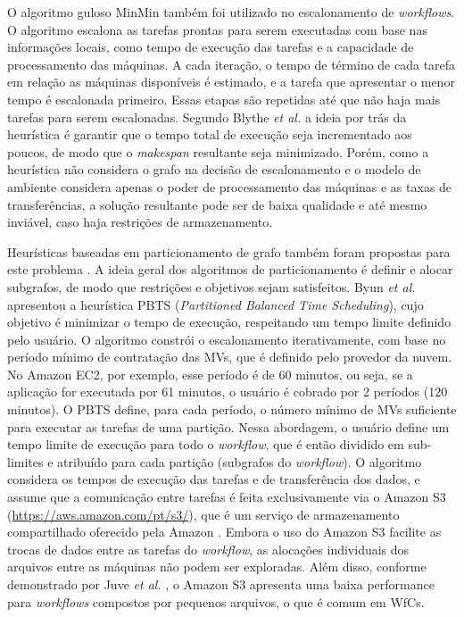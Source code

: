 O algoritmo guloso MinMin \cite{minmin} também foi utilizado no escalonamento de \textit{workflows}. O algoritmo escalona as tarefas prontas para serem executadas com base nas informações locais, como tempo de execução das tarefas e a capacidade de processamento das máquinas. A cada iteração, o tempo de término de cada tarefa em relação as máquinas disponíveis é estimado, e a tarefa que apresentar o menor tempo é escalonada primeiro. Essas etapas são repetidas até que não haja mais tarefas para serem escalonadas. Segundo Blythe \textit{et al.} \cite{minmin} a ideia por trás da heurística é  garantir que o tempo total de execução seja incrementado aos poucos, de modo que o \textit{makespan} resultante seja minimizado. Porém, como a heurística não considera o grafo na decisão de escalonamento e o modelo de ambiente considera apenas o poder de processamento das máquinas e as taxas de transferências, a solução resultante pode ser de baixa qualidade e até mesmo inviável, caso haja restrições de armazenamento.

Heurísticas baseadas em particionamento de grafo também foram propostas para este problema \cite{Byun2011, Abrishami}. A ideia geral dos algoritmos de particionamento é definir e alocar subgrafos, de modo que restrições e objetivos sejam satisfeitos. Byun \textit{et al.} \cite{Byun2011} apresentou a heurística PBTS (\textit{Partitioned Balanced Time Scheduling}), cujo objetivo é minimizar o  tempo de execução, respeitando um tempo limite definido pelo usuário. O algoritmo constrói o escalonamento iterativamente, com base no período mínimo de contratação das MVs, que é definido pelo provedor da nuvem. No Amazon EC2, por exemplo, esse período é de 60 minutos, ou seja, se a aplicação for executada por 61 minutos, o usuário é cobrado por 2 períodos (120 minutos). O PBTS define, para cada período, o número mínimo de MVs suficiente para executar as tarefas de uma partição. Nessa abordagem, o usuário define um tempo limite de execução para todo o \textit{workflow}, que é então dividido em sub-limites e atribuído para cada partição (subgrafos do \textit{workflow}). O algoritmo considera os tempos de execução das tarefas e de transferência dos dados, e assume que a comunicação entre tarefas é feita exclusivamente via o Amazon S3 (\url{https://aws.amazon.com/pt/s3/}), que é um serviço de armazenamento compartilhado oferecido pela Amazon \cite{AmazonEC2}. Embora o uso do Amazon S3 facilite as trocas de dados entre as tarefas do \textit{workflow}, as alocações individuais dos arquivos entre as máquinas não podem ser exploradas. Além disso, conforme demonstrado por Juve \textit{et al.} \cite{juve2010}, o Amazon S3 apresenta uma baixa performance para \textit{workflows} compostos por pequenos arquivos, o que é comum em WfCs.

